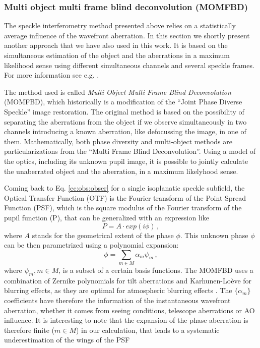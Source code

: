 \subsubsection[Multi object multi frame blind deconvolution]{Multi object multi frame blind deconvolution (MOMFBD)\label{momfbd}}
The speckle interferometry method presented above relies on a statistically average influence of the wavefront aberration. In this section we shortly present another approach that we have also used in this work. It is based on the simultaneous estimation of the object and the aberrations in a maximum likelihood sense using different simultaneous channels and several speckle frames. For more information see e.g. \citep{Lofdahl:2002qy,2005SoPh..228..191V,2007msfa.conf..119L}.

The method used is called \emph{Multi Object Multi Frame Blind Deconvolution} (MOMFBD), which historically is a modification of the ``Joint Phase Diverse Speckle'' image restoration. The original method is based on the possibility of separating the aberrations from the object if we observe simultaneously in two channels introducing a known aberration, like defocussing the image, in one of them. Mathematically, both phase diversity and multi-object methods are particularizations from the ``Multi Frame Blind Deconvolution''. Using a model of the optics, including its unknown pupil image, it is possible to jointly calculate the unaberrated object and the aberration, in a maximum likelyhood sense.

Coming back to Eq. \ref{ec:obs:obser} for a single isoplanatic speckle subfield,  the Optical Transfer Function (OTF) is the Fourier transform of the Point Spread Function (PSF), which is the square modulus of the Fourier transform of the pupil function (P), that can be generalized with an expression like
\begin{equation}
P= A\cdot exp(i\phi) \, ,
\label{ec:momfbd:pupil}
\end{equation}
where $A$ stands for the geometrical extent of the phase $\phi$. This unknown phase  $\phi$ can be then parametrized using a polynomial expansion:
\begin{equation}
\phi = \sum_{m\in M} \alpha_{m} \psi_{m} \, ,
\label{eq:momfdb:expan}
\end{equation}
where $\psi_{m},m \in M$, is a subset of a certain basis functions. The MOMFBD uses a combination of Zernike polynomials \citep{1976JOSA...66..207N} for tilt aberrations and Karhunen-Lo\`eve for blurring effects, as they are optimal for atmospheric blurring effects \citep{1990SPIE.1237..668R} . The $\{\alpha_{m} \}$ coefficients have therefore the information of the instantaneous wavefront aberration, whether it comes from seeing conditions, telescope aberrations or AO influence. It is interesting to note that the expansion of the phase aberration is therefore finite ($m \in M$) in our calculation, that leads to a systematic underestimation of the wings of the PSF 
\citep{2005SoPh..228..191V}

